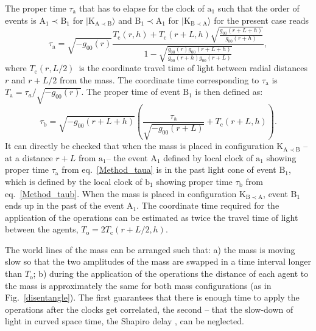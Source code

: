 \documentclass[a4paper,11pt]{article}
\newcommand{\ket}{\rangle}
\newcommand{\be}{\begin{equation}}
\newcommand{\ee}[1]{\label{#1} \end{equation}}
\begin{document}
The proper time $\tau_\mathrm{a}$ that has to elapse for the clock of $\mathrm a_1$  such that the order of events  is $\mathrm{A_1 \prec B_1}$ for  $|\mathrm{K_{A\prec B}}\ket$ and  $\mathrm{B_1 \prec A_1}$ for  $|\mathrm{K_{B\prec A}\ket}$ for the present case reads 
\be
\tau_\mathrm{a}= \sqrt{-g_\mathrm{00}(r)}\frac{T_\mathrm{c}(r,h) + T_\mathrm{c}(r+L,h)\sqrt{\frac{g_\mathrm{00}(r+L+h)}{g_\mathrm{00}(r+h)}}}{  1 - \sqrt{\frac{g_\mathrm{00}(r)g_\mathrm{00}(r+L+h)}{g_\mathrm{00}(r+h)g_\mathrm{00}(r+L)}}},
\ee{Method_taua}
where $T_\mathrm{c}(r, L/2)$~is the coordinate travel time of light between radial  distances $r$ and $r+L/2$ from the mass.  The coordinate time corresponding to $\tau_\mathrm{a}$ is $T_\mathrm{a}=\tau_a/\sqrt{-g_\mathrm{00}(r)}$. %
The proper time of event $\mathrm B_1$ is then defined as: 
\be
\tau_\mathrm{b}=\sqrt{-g_\mathrm{00}(r+L+h)}(\frac{\tau_\mathrm{a}}{\sqrt{-g_\mathrm{00}(r+L)}}+ T_\mathrm{c}(r+L,h)).
\ee{Method_taub}
It can directly be checked that when the mass is placed in configuration $\mathrm{K_{A\prec B}}$ -- at a distance $r+L$ from $\mathrm a_1$-- the event $\mathrm A_1$ defined by local clock of $\mathrm a_1$ showing proper time $\tau_\mathrm{a}$ from eq.~\eqref{Method_taua} is in the past light cone of event $\mathrm B_1$, which is defined by the local clock of $\mathrm b_1$ showing proper time $\tau_\mathrm{b}$ from eq.~\eqref{Method_taub}. When the mass is placed in configuration $\mathrm{K_{B\prec A}}$, event $\mathrm B_1$ ends up in the past of the event $\mathrm A_1$.
The coordinate time required for the application of the operations can be estimated as twice the travel time of light between the agents, $T_\mathrm{o}=2T_\mathrm{c}(r+L/2, h)$.

The world lines of the mass can be arranged such that: a) the mass is moving slow so that the two amplitudes of the mass are swapped in a time interval longer than $T_\mathrm{o}$; b) during the application of the operations the distance of each agent to the mass is approximately the same for both mass configurations (as in Fig.~\ref{disentangle}). The first guarantees that  there is enough time to apply the operations after the clocks get correlated, the second -- that the slow-down of light in curved space time, the Shapiro delay \cite{ref:Shapiro1964, ref:Shapiro1971},  can be neglected.
\end{document}
